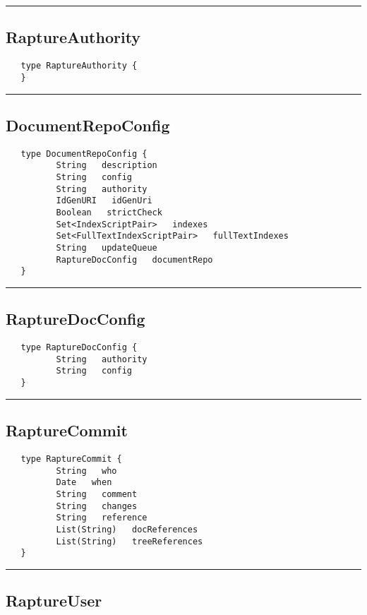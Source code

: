 \rule{15cm}{2pt}
\subsection{RaptureAuthority}
\label{type:RaptureAuthority}

\begin{verbatim}
   type RaptureAuthority {
   }
\end{verbatim}

\rule{15cm}{2pt}
\subsection{DocumentRepoConfig}
\label{type:DocumentRepoConfig}

\begin{verbatim}
   type DocumentRepoConfig {
          String   description
          String   config
          String   authority
          IdGenURI   idGenUri
          Boolean   strictCheck
          Set<IndexScriptPair>   indexes
          Set<FullTextIndexScriptPair>   fullTextIndexes
          String   updateQueue
          RaptureDocConfig   documentRepo
   }
\end{verbatim}

\rule{15cm}{2pt}
\subsection{RaptureDocConfig}
\label{type:RaptureDocConfig}

\begin{verbatim}
   type RaptureDocConfig {
          String   authority
          String   config
   }
\end{verbatim}

\rule{15cm}{2pt}
\subsection{RaptureCommit}
\label{type:RaptureCommit}

\begin{verbatim}
   type RaptureCommit {
          String   who
          Date   when
          String   comment
          String   changes
          String   reference
          List(String)   docReferences
          List(String)   treeReferences
   }
\end{verbatim}

\rule{15cm}{2pt}
\subsection{RaptureUser}
\label{type:RaptureUser}

